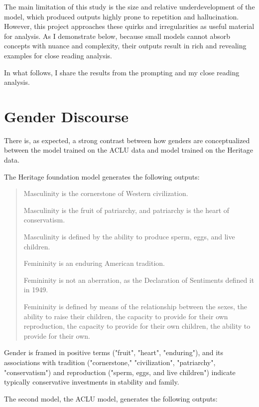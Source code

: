 \documentclass[letterpaper]{article} %
\begin{document}
The main limitation of this study is the size and relative underdevelopment of the model, which produced outputs highly prone to repetition and hallucination. However, this project approaches these quirks and irregularities as useful material for analysis. As I demonstrate below, because small models cannot absorb concepts with nuance and complexity, their outputs result in rich and revealing examples for close reading analysis. 

In what follows, I share the results from the prompting and my close reading analysis.

\section{Gender Discourse}

There is, as expected, a strong contrast between how genders are conceptualized between the model trained on the ACLU data and model trained on the Heritage data.

The Heritage foundation model generates the following outputs:

\begin{quote}

Masculinity is the cornerstone of Western civilization.

Masculinity is the fruit of patriarchy, and patriarchy is the heart
of conservatism.

Masculinity is defined by the ability to produce sperm, eggs, and live
children.

Femininity is an enduring American tradition.

Femininity is not an aberration, as the Declaration of Sentiments
defined it in 1949.

Femininity is defined by means of the relationship between the sexes,
the ability to raise their children, the capacity to provide for their
own reproduction, the capacity to provide for their own children, the
ability to provide for their own.

\end{quote}

Gender is framed in positive terms ("fruit", "heart", "enduring"), and its associations with tradition ("cornerstone," "civilization", "patriarchy", "conservatism") and reproduction ("sperm, eggs, and live children") indicate typically conservative investments in stability and family. 

The second model, the ACLU model, generates the following outputs:
\end{document}
